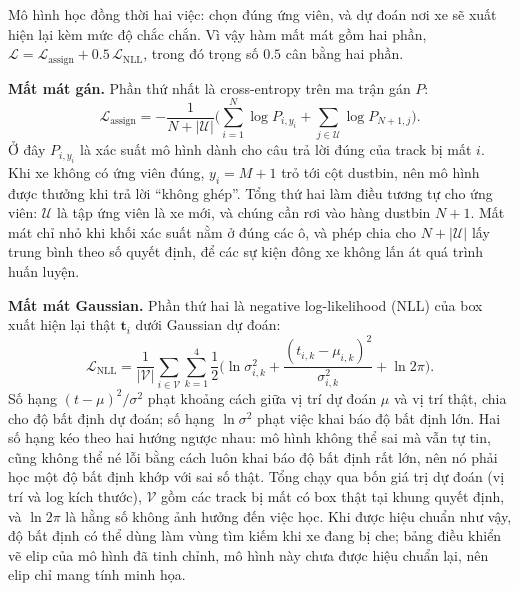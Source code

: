 Mô hình học đồng thời hai việc: chọn đúng ứng viên, và dự đoán nơi xe sẽ xuất hiện lại kèm mức độ chắc chắn. Vì vậy hàm mất mát gồm hai phần, $\mathcal{L} = \mathcal{L}_{\text{assign}} + 0.5\,\mathcal{L}_{\text{NLL}}$, trong đó trọng số $0.5$ cân bằng hai phần.

\textbf{Mất mát gán.} Phần thứ nhất là cross-entropy trên ma trận gán $P$:
\begin{equation}
    \mathcal{L}_{\text{assign}} = -\frac{1}{N + |\mathcal{U}|}\Big(\sum_{i=1}^{N} \log P_{i,y_i} + \sum_{j \in \mathcal{U}} \log P_{N+1,j}\Big).
\end{equation}
Ở đây $P_{i,y_i}$ là xác suất mô hình dành cho câu trả lời đúng của track bị mất $i$. Khi xe không có ứng viên đúng, $y_i = M+1$ trỏ tới cột dustbin, nên mô hình được thưởng khi trả lời ``không ghép''. Tổng thứ hai làm điều tương tự cho ứng viên: $\mathcal{U}$ là tập ứng viên là xe mới, và chúng cần rơi vào hàng dustbin $N+1$. Mất mát chỉ nhỏ khi khối xác suất nằm ở đúng các ô, và phép chia cho $N + |\mathcal{U}|$ lấy trung bình theo số quyết định, để các sự kiện đông xe không lấn át quá trình huấn luyện.

\textbf{Mất mát Gaussian.} Phần thứ hai là negative log-likelihood (NLL) của box xuất hiện lại thật $\mathbf{t}_i$ dưới Gaussian dự đoán:
\begin{equation}
    \mathcal{L}_{\text{NLL}} = \frac{1}{|\mathcal{V}|}\sum_{i \in \mathcal{V}} \sum_{k=1}^{4} \frac{1}{2}\Big(\ln\sigma^2_{i,k} + \frac{(t_{i,k}-\mu_{i,k})^2}{\sigma^2_{i,k}} + \ln 2\pi\Big).
\end{equation}
Số hạng $(t-\mu)^2/\sigma^2$ phạt khoảng cách giữa vị trí dự đoán $\mu$ và vị trí thật, chia cho độ bất định dự đoán; số hạng $\ln\sigma^2$ phạt việc khai báo độ bất định lớn. Hai số hạng kéo theo hai hướng ngược nhau: mô hình không thể sai mà vẫn tự tin, cũng không thể né lỗi bằng cách luôn khai báo độ bất định rất lớn, nên nó phải học một độ bất định khớp với sai số thật. Tổng chạy qua bốn giá trị dự đoán (vị trí và log kích thước), $\mathcal{V}$ gồm các track bị mất có box thật tại khung quyết định, và $\ln 2\pi$ là hằng số không ảnh hưởng đến việc học. Khi được hiệu chuẩn như vậy, độ bất định có thể dùng làm vùng tìm kiếm khi xe đang bị che; bảng điều khiển vẽ elip của mô hình đã tinh chỉnh, mô hình này chưa được hiệu chuẩn lại, nên elip chỉ mang tính minh họa.

